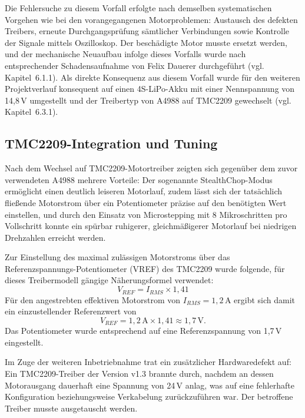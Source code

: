 \documentclass[12pt,ngerman,numbers=noenddot,abstracton,headsepline]{scrreprt}
\begin{document}
Die Fehlersuche zu diesem Vorfall erfolgte nach demselben systematischen Vorgehen wie bei den vorangegangenen Motorproblemen: Austausch des defekten Treibers, erneute Durchgangsprüfung sämtlicher Verbindungen sowie Kontrolle der Signale mittels Oszilloskop. Der beschädigte Motor musste ersetzt werden, und der mechanische Neuaufbau infolge dieses Vorfalls wurde nach entsprechender Schadensaufnahme von Felix Dauerer durchgeführt (vgl. Kapitel~6.1.1). Als direkte Konsequenz aus diesem Vorfall wurde für den weiteren Projektverlauf konsequent auf einen 4S-LiPo-Akku mit einer Nennspannung von 14,8\,V umgestellt und der Treibertyp von A4988 auf TMC2209 gewechselt (vgl. Kapitel~6.3.1).

\subsection{TMC2209-Integration und Tuning}
\label{subsec:tmc2209_integration}

Nach dem Wechsel auf TMC2209-Motortreiber zeigten sich gegenüber dem zuvor verwendeten A4988 mehrere Vorteile: Der sogenannte StealthChop-Modus ermöglicht einen deutlich leiseren Motorlauf, zudem lässt sich der tatsächlich fließende Motorstrom über ein Potentiometer präzise auf den benötigten Wert einstellen, und durch den Einsatz von Microstepping mit 8 Mikroschritten pro Vollschritt konnte ein spürbar ruhigerer, gleichmäßigerer Motorlauf bei niedrigen Drehzahlen erreicht werden.

Zur Einstellung des maximal zulässigen Motorstroms über das Referenzspannungs-Potentiometer (VREF) des TMC2209 wurde folgende, für dieses Treibermodell gängige Näherungsformel verwendet:
\begin{equation}
    V_{REF} = I_{RMS} \times 1{,}41
\end{equation}
Für den angestrebten effektiven Motorstrom von $I_{RMS} = 1{,}2$\,A ergibt sich damit ein einzustellender Referenzwert von
\begin{equation}
    V_{REF} = 1{,}2\,\text{A} \times 1{,}41 \approx 1{,}7\,\text{V}.
\end{equation}
Das Potentiometer wurde entsprechend auf eine Referenzspannung von 1,7\,V eingestellt.

Im Zuge der weiteren Inbetriebnahme trat ein zusätzlicher Hardwaredefekt auf: Ein TMC2209-Treiber der Version v1.3 brannte durch, nachdem an dessen Motorausgang dauerhaft eine Spannung von 24\,V anlag, was auf eine fehlerhafte Konfiguration beziehungsweise Verkabelung zurückzuführen war. Der betroffene Treiber musste ausgetauscht werden.
\end{document}
